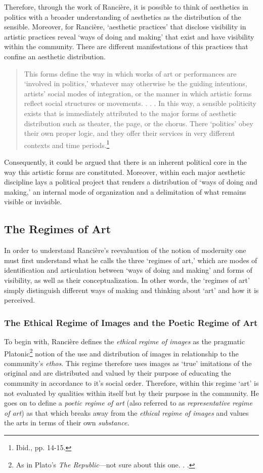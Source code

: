 Therefore, through the work of Ranci\`{e}re, it is possible to think of aesthetics in politics with a broader understanding of aesthetics as the distribution of the sensible. Moreover, for Ranci\`{e}re, `aesthetic practices' that disclose visibility in artistic practices reveal `ways of doing and making' that exist and have visibility within the community. There are different manifestations of this practices that confine an aesthetic distribution.

\begin{quote}
This forms define the way in which works of art or performances are `involved in politics,' whatever may otherwise be the guiding intentions, artists' social modes of integration, or the manner in which artistic forms reflect social structures or movements. . . . In this way, a sensible politicity exists that is immediately attributed to the major forms of aesthetic distribution such as theater, the page, or the chorus. There `politics' obey their own proper logic, and they offer their services in very different contexts and time periods.\footnote{Ibid., pp. 14-15.} 
\end{quote}
Consequently, it could be argued that there is an inherent political core in the way this artistic forms are constituted. Moreover, within each major aesthetic discipline lays a political project that renders a distribution of `ways of doing and making,' an internal mode of organization and a delimitation of what remains visible or invisible.    

\subsection{The Regimes of Art}

In order to understand Ranci\`{e}re's reevaluation of the notion of modernity one must first understand what he calls the three `regimes of art,' which are modes of identification and articulation between `ways of doing and making' and forms of visibility, as well as their conceptualization. In other words, the `regimes of art' simply distinguish different ways of making and thinking about `art' and how it is perceived.

\subsubsection{The Ethical Regime of Images and the Poetic Regime of Art}

To begin with, Ranci\`{e}re defines the \emph{ethical regime of images} as the pragmatic Platonic\footnote{As in Plato's \emph{The Republic}---not sure about this one. . .} notion of the use and distribution of images in relationship to the community's \emph{ethos}. This regime therefore uses images as `true' imitations of the original and are distributed and valued by their purpose of educating the community in accordance to it's social order. Therefore, within this regime `art' is not evaluated by qualities within itself but by their purpose in the community. He goes on to define a \emph{poetic regime of art} (also referred to as \emph{representative regime of art}) as that which breaks away from the \emph{ethical regime of images} and values the arts in terms of their own \emph{substance}.

